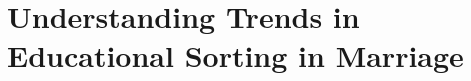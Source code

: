 \chapter{Understanding Trends in Educational Sorting in Marriage}
\label{chap:explain-edu-sorting}








